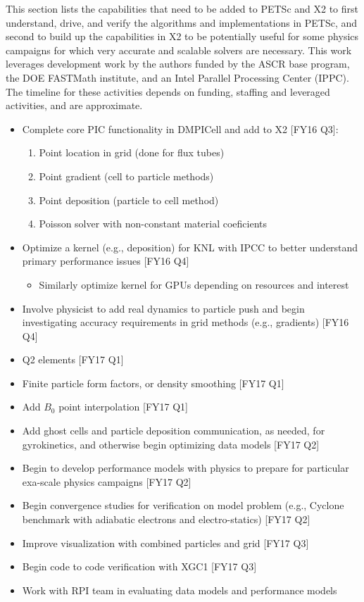 \documentclass[review]{siamart}
\begin{document}
This section lists the capabilities that need to be added to PETSc and X2 to first understand, drive, and verify the algorithms and implementations in PETSc, and second to build up the capabilities in X2 to be potentially useful for some physics campaigns for which very accurate and scalable solvers are necessary. This work leverages development work by the authors funded by the ASCR base program, the DOE FASTMath institute, and an Intel Parallel Processing Center (IPPC).
The timeline for these activities depends on funding, staffing and leveraged activities, and are approximate.
\begin{itemize}
\item Complete core PIC functionality in DMPICell and add to X2 [FY16 Q3]:
\begin{enumerate}
\item Point location in grid (done for flux tubes)
\item Point gradient (cell to particle methods)
\item Point deposition (particle to cell method)
\item Poisson solver with non-constant material coeficients 
\end{enumerate}
\item Optimize a kernel (e.g., deposition) for KNL with IPCC to better understand primary performance issues [FY16 Q4]
\begin{itemize}
\item Similarly optimize kernel for GPUs depending on resources and interest
\end{itemize}
\item Involve physicist to add real dynamics to particle push and begin investigating accuracy requirements in grid methods (e.g., gradients) [FY16 Q4]
\item Q2 elements [FY17 Q1]
\item Finite particle form factors, or density smoothing [FY17 Q1]
\item Add $B_0$ point interpolation [FY17 Q1]
\item Add ghost cells and particle deposition communication, as needed, for gyrokinetics, and otherwise begin optimizing data models [FY17 Q2]
\item Begin to develop performance models with physics to prepare for particular exa-scale physics campaigns [FY17 Q2]
\item Begin convergence studies for verification on model problem (e.g., Cyclone benchmark with adiabatic electrons and electro-statics) [FY17 Q2]
\item Improve visualization with combined particles and grid [FY17 Q3]
\item Begin code to code verification with XGC1 [FY17 Q3]
\item Work with RPI team in evaluating data models and performance models
\end{itemize}


 
\end{document}
